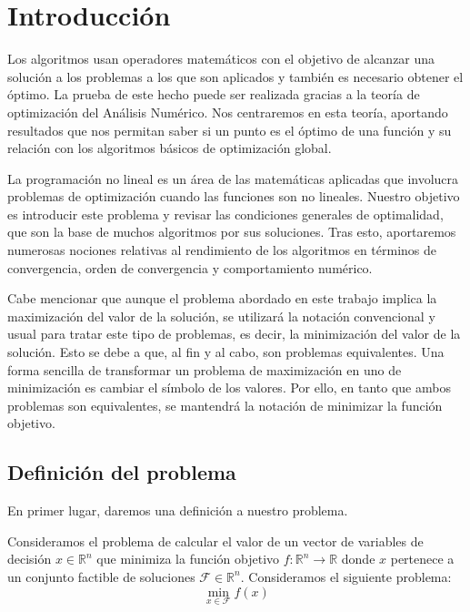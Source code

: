 \chapter{Introducción}

Los algoritmos usan operadores matemáticos con el objetivo de alcanzar una solución a los problemas a los que son aplicados y también es necesario obtener el óptimo. 
La prueba de este hecho puede ser realizada gracias a la teoría de optimización del Análisis Numérico. 
Nos centraremos en esta teoría, aportando resultados que nos permitan saber si un punto es el óptimo de una función y su relación con los algoritmos básicos de optimización global. 

La programación no lineal es un área de las matemáticas aplicadas que involucra problemas de optimización cuando las funciones son no lineales. 
Nuestro objetivo es introducir este problema y revisar las condiciones generales de optimalidad, que son la base de muchos algoritmos por sus soluciones. 
Tras esto, aportaremos numerosas nociones relativas al rendimiento de los algoritmos en términos de convergencia, orden de convergencia y comportamiento numérico.

Cabe mencionar que aunque el problema abordado en este trabajo implica la maximización del valor de la solución, se utilizará la notación convencional y usual para tratar este tipo de problemas, es decir, la minimización del valor de la solución. 
Esto se debe a que, al fin y al cabo, son problemas equivalentes. 
Una forma sencilla de transformar un problema de maximización en uno de minimización es cambiar el símbolo de los valores. 
Por ello, en tanto que ambos problemas son equivalentes, se mantendrá la notación de minimizar la función objetivo.

\section{Definición del problema}

En primer lugar, daremos una definición a nuestro problema.

\begin{definicion}
Consideramos el problema de calcular el valor de un vector de variables de decisión $x\in\mathbb{R}^n$ que minimiza la función objetivo $f:\mathbb{R}^n\xrightarrow{}{}\mathbb{R}$ donde $x$ pertenece a un conjunto factible de soluciones $\mathcal{F}\in\mathbb{R}^n$. 
Consideramos el siguiente problema:
\begin{equation}
\min_{x\in\mathcal{F}}f(x)
\label{eq:4.1}
\end{equation}
\end{definicion}

